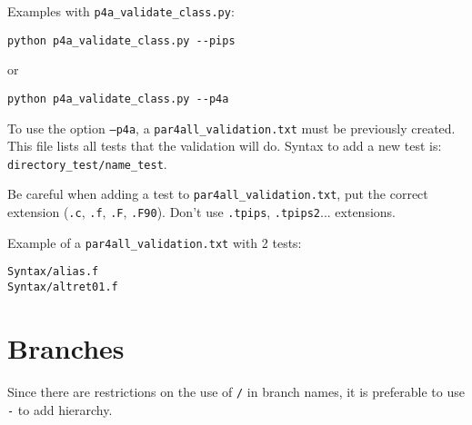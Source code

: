 \documentclass[a4paper]{article}
\begin{document}
Examples with \verb|p4a_validate_class.py|:
\begin{verbatim}
python p4a_validate_class.py --pips
\end{verbatim}
or
\begin{verbatim}
python p4a_validate_class.py --p4a
\end{verbatim}

To use the option \texttt{--p4a}, a \verb|par4all_validation.txt| must be
previously created. This file lists all tests that the validation will do.
Syntax to add a new test is: \verb|directory_test/name_test|.

Be careful when adding a test to \verb|par4all_validation.txt|, put the
correct extension (\texttt{.c}, \texttt{.f}, \texttt{.F},
\texttt{.F90}). Don't use \texttt{.tpips}, \texttt{.tpips2}... extensions.

Example of a \verb|par4all_validation.txt| with 2 tests:
\begin{verbatim}
Syntax/alias.f
Syntax/altret01.f
\end{verbatim}


\section{Branches}
\label{sec:branches}

Since there are restrictions on the use of \texttt{/} in branch names,
it is preferable to use \texttt{-} to add hierarchy.
\end{document}
